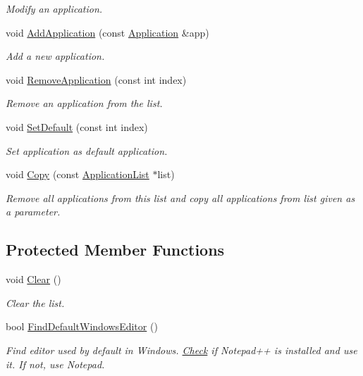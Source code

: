 \begin{DoxyCompactItemize}
\begin{DoxyCompactList}\small\item\em Modify an application. \end{DoxyCompactList}\item 
void \hyperlink{class_application_list_aec0f69cf2bd73d07eed17dfc918e64ee}{Add\-Application} (const \hyperlink{class_application}{Application} \&app)
\begin{DoxyCompactList}\small\item\em Add a new application. \end{DoxyCompactList}\item 
void \hyperlink{class_application_list_aeb220e504fe8c69e7ab533ce795f5b68}{Remove\-Application} (const int index)
\begin{DoxyCompactList}\small\item\em Remove an application from the list. \end{DoxyCompactList}\item 
void \hyperlink{class_application_list_a391acbf41368908a9c6e53494bce23fb}{Set\-Default} (const int index)
\begin{DoxyCompactList}\small\item\em Set application as default application. \end{DoxyCompactList}\item 
void \hyperlink{class_application_list_a192280bd8e3afa1d29711c77d682ad89}{Copy} (const \hyperlink{class_application_list}{Application\-List} $\ast$list)
\begin{DoxyCompactList}\small\item\em Remove all applications from this list and copy all applications from list given as a parameter. \end{DoxyCompactList}\end{DoxyCompactItemize}
\subsection*{Protected Member Functions}
\begin{DoxyCompactItemize}
\item 
void \hyperlink{class_application_list_a588d75d7d329a6694a6f94a0dca380d1}{Clear} ()
\begin{DoxyCompactList}\small\item\em Clear the list. \end{DoxyCompactList}\item 
bool \hyperlink{class_application_list_a0d32b112cd8357336bd192734bfe1685}{Find\-Default\-Windows\-Editor} ()
\begin{DoxyCompactList}\small\item\em Find editor used by default in Windows. \hyperlink{class_check}{Check} if Notepad++ is installed and use it. If not, use Notepad. \end{DoxyCompactList}\end{DoxyCompactItemize}


